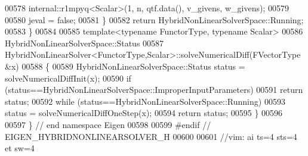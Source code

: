 \begin{DoxyCode}
00578         internal::r1mpyq<Scalar>(1, n, qtf.data(), v\_givens, w\_givens);
00579 
00580         jeval = \textcolor{keyword}{false};
00581     \}
00582     \textcolor{keywordflow}{return} HybridNonLinearSolverSpace::Running;
00583 \}
00584 
00585 \textcolor{keyword}{template}<\textcolor{keyword}{typename} FunctorType, \textcolor{keyword}{typename} Scalar>
00586 HybridNonLinearSolverSpace::Status
00587 HybridNonLinearSolver<FunctorType,Scalar>::solveNumericalDiff(FVectorType  &x)
00588 \{
00589     HybridNonLinearSolverSpace::Status status = solveNumericalDiffInit(x);
00590     \textcolor{keywordflow}{if} (status==HybridNonLinearSolverSpace::ImproperInputParameters)
00591         \textcolor{keywordflow}{return} status;
00592     \textcolor{keywordflow}{while} (status==HybridNonLinearSolverSpace::Running)
00593         status = solveNumericalDiffOneStep(x);
00594     \textcolor{keywordflow}{return} status;
00595 \}
00596 
00597 \} \textcolor{comment}{// end namespace Eigen}
00598 
00599 \textcolor{preprocessor}{#endif // EIGEN\_HYBRIDNONLINEARSOLVER\_H}
00600 
00601 \textcolor{comment}{//vim: ai ts=4 sts=4 et sw=4}
\end{DoxyCode}
